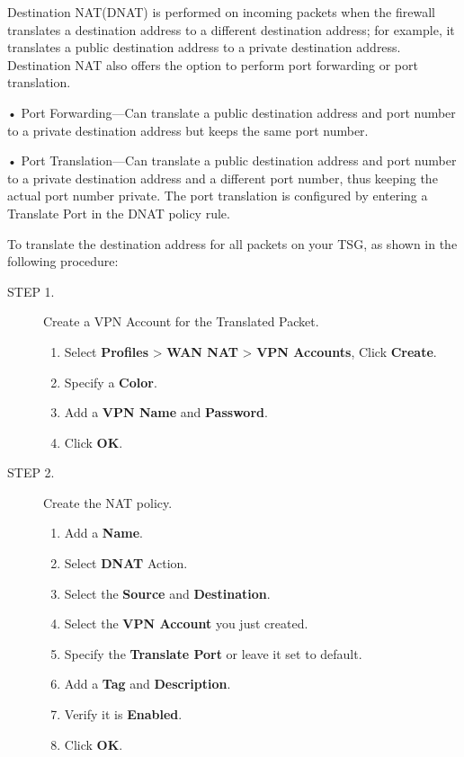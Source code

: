 Destination NAT(DNAT) is performed on incoming packets when the firewall translates a destination address to a different destination address; for example, it translates a public destination address to a private destination address. Destination NAT also offers the option to perform port forwarding or port translation.


• Port Forwarding—Can translate a public destination address and port number to a private destination address but keeps the same port number. 


• Port Translation—Can translate a public destination address and port number to a private destination address and a different port number, thus keeping the actual port number private. The port translation is configured by entering a Translate Port in the DNAT policy rule.


To translate the destination address for all packets on your TSG, as shown in the following procedure:

\begin{description}

    \item[STEP 1.]	Create a VPN Account for the Translated Packet.
    \begin{enumerate}
        \item	Select \textbf{Profiles} > \textbf{WAN NAT} > \textbf{VPN Accounts}, Click \textbf{Create}.
        \item	Specify a \textbf{Color}.
        \item	Add a \textbf{VPN Name} and \textbf{Password}.
        \item	Click \textbf{OK}.
    \end{enumerate}
    \item[STEP 2.]	Create the NAT policy.
    \begin{enumerate} 
        \item	Add a \textbf{Name}.
        \item	Select \textbf{DNAT} Action.
        \item	Select the \textbf{Source} and \textbf{Destination}. 
        \item	Select the \textbf{VPN Account} you just created. 
        \item	Specify the \textbf{Translate Port} or leave it set to default.
        \item	Add a \textbf{Tag} and \textbf{Description}.
        \item	Verify it is \textbf{Enabled}.
        \item	Click \textbf{OK}.
    \end{enumerate}
\end{description}

